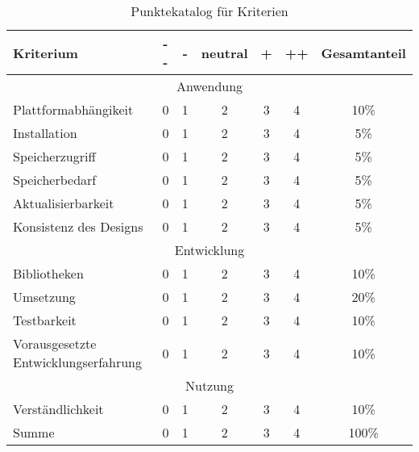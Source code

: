 \begin{table}[h]
	\centering
	\begin{tabularx}{\textwidth}{|l||c|c|c|c|c|c|}
		\hline
		Kriterium              & - - & - & neutral & + & ++ & Gesamtanteil \\
		\hline
		\multicolumn{7}{c}{Anwendung}                                      \\
		\hline
		Plattformabhängikeit   & 0   & 1 & 2       & 3 & 4  & 10\%         \\
		Installation           & 0   & 1 & 2       & 3 & 4  & 5\%          \\
		Speicherzugriff        & 0   & 1 & 2       & 3 & 4  & 5\%          \\
		Speicherbedarf         & 0   & 1 & 2       & 3 & 4  & 5\%          \\
		Aktualisierbarkeit     & 0   & 1 & 2       & 3 & 4  & 5\%          \\
		Konsistenz des Designs & 0   & 1 & 2       & 3 & 4  & 5\%         \\

		\hline
		\multicolumn{7}{c}{Entwicklung}                                    \\
		\hline
		Bibliotheken           & 0   & 1 & 2       & 3 & 4  & 10\%         \\
		Umsetzung              & 0   & 1 & 2       & 3 & 4  & 20\%         \\
		Testbarkeit            & 0   & 1 & 2       & 3 & 4  & 10\%         \\
		Vorausgesetzte Entwicklungserfahrung    & 0   & 1 & 2       & 3 & 4  & 10\%         \\

		\hline
		\multicolumn{7}{c}{Nutzung}                                        \\
		\hline
		Verständlichkeit       & 0   & 1 & 2       & 3 & 4  & 10\%         \\
		\hline

		\hline
		Summe                  & 0   & 1 & 2       & 3 & 4  & 100\%        \\
		\hline
	\end{tabularx}
	\caption{Punktekatalog für Kriterien} \label{tab:punktekatalog}
\end{table}



